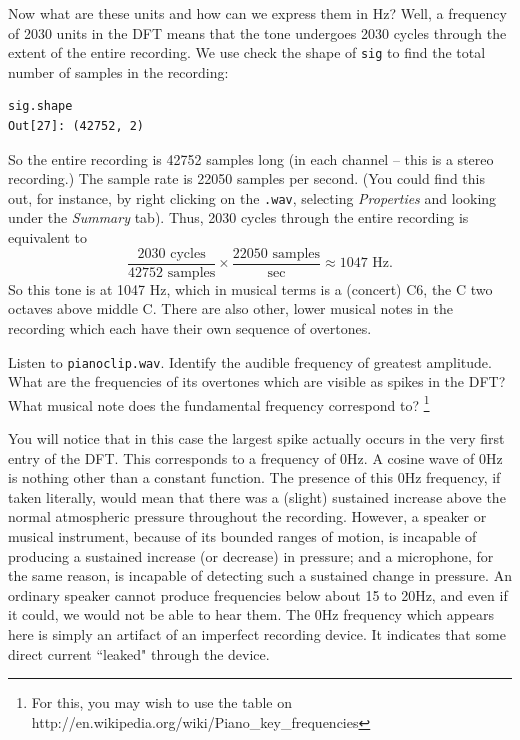 Now what are these units and how can we express them in Hz? Well, a frequency of 2030 units in the DFT means that the tone undergoes 2030 cycles through the extent of the entire recording. We use check the shape of \texttt{sig} to find the total number of samples in the recording:
\begin{verbatim}
sig.shape
Out[27]: (42752, 2)
\end{verbatim}
So the entire recording is 42752 samples long (in each channel -- this is a stereo recording.) The sample rate is 22050 samples per second. (You could find this out, for instance, by right clicking on the \texttt{.wav}, selecting \emph{Properties} and looking under the \emph{Summary} tab).  Thus, 2030 cycles through the entire recording is equivalent to
$$\frac{2030\text{ cycles}}{42752\text{ samples}} \times \frac{22050\text{ samples}}{\text{sec}} \approx 1047 \text{ Hz}.$$
So this tone is at 1047 Hz, which in musical terms is a (concert) C6, the C two octaves above middle C. There are also other, lower musical notes in the recording which each have their own sequence of overtones.

\begin{problem}
Listen to \texttt{pianoclip.wav}. Identify the audible frequency of greatest amplitude. What are the frequencies of its overtones which are visible as spikes in the DFT? What musical note does the fundamental frequency correspond to? \footnote{For this, you may wish to use the table on http://en.wikipedia.org/wiki/Piano\_key\_frequencies}
\end{problem}

You will notice that in this case the largest spike actually occurs in the very first entry of the DFT. This corresponds to a frequency of 0Hz. A cosine wave of 0Hz is nothing other than a constant function. The presence of this 0Hz frequency, if taken literally, would mean that there was a (slight) sustained increase above the normal atmospheric pressure throughout the recording. However, a speaker or musical instrument, because of its bounded ranges of motion, is incapable of producing a sustained increase (or decrease) in pressure; and a microphone, for the same reason, is incapable of detecting such a sustained change in pressure. An ordinary speaker cannot produce frequencies below about 15 to 20Hz, and even if it could, we would not be able to hear them. The 0Hz frequency which appears here is simply an artifact of an imperfect recording device. It indicates that some direct current ``leaked" through the device.


